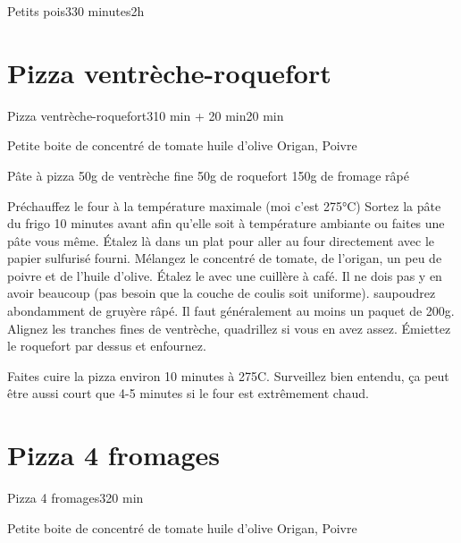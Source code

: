 {\begin{recette}{Petits pois}{3}{30 minutes}{2h}
\end{recette}


\section{Pizza ventrèche-roquefort}
\begin{recette}{Pizza ventrèche-roquefort}{3}{10 min + 20 min}{20 min}
\begin{ingredients}
\ingredient Petite boite de concentré de tomate
\ingredient huile d'olive
\ingredient Origan, Poivre

\ingredient Pâte à pizza
\ingredient 50g de ventrèche fine
\ingredient 50g de roquefort
\ingredient 150g de fromage râpé
\end{ingredients}

\begin{preparation}
\etape Préchauffez le four à la température maximale (moi c'est 275°C)
\etape Sortez la pâte du frigo 10 minutes avant afin qu'elle soit à température ambiante ou faites une pâte vous même.
\etape Étalez là dans un plat pour aller au four directement avec le papier sulfurisé fourni.
\etape Mélangez le concentré de tomate, de l'origan, un peu de poivre et de l'huile d'olive.
\etape Étalez le avec une cuillère à café. Il ne dois pas y en avoir beaucoup (pas besoin que la couche de coulis soit 
uniforme).
\etape saupoudrez abondamment de gruyère râpé. Il faut généralement au moins un paquet de 200g.
\etape Alignez les tranches fines de ventrèche, quadrillez si vous en avez assez. Émiettez le roquefort par dessus et enfournez.
\end{preparation}

\begin{cuisson}
Faites cuire la pizza environ 10 minutes à 275\degres C. Surveillez bien entendu, ça peut être aussi court que 4-5 minutes si 
le four est extrêmement chaud.
\end{cuisson}
\end{recette}

\section{Pizza 4 fromages}
\begin{recette}{Pizza 4 fromages}{3}{}{20 min}

\begin{ingredients}
\ingredient Petite boite de concentré de tomate
\ingredient huile d'olive
\ingredient Origan, Poivre


\end{ingredients}
\end{recette}}
